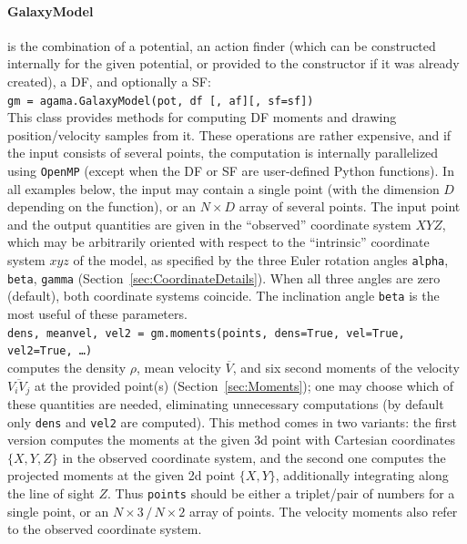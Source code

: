 \documentclass[12pt]{article}
\let\oldparagraph\paragraph
\renewcommand{\paragraph}[1]{\vspace{-2mm}\oldparagraph{#1}}
\begin{document}
\paragraph{GalaxyModel} is the combination of a potential, an action finder (which can be constructed internally for the given potential, or provided to the constructor if it was already created), a DF, and optionally a SF:\\
\texttt{gm = agama.GalaxyModel(pot, df [, af][, sf=sf])}\\[2mm]
This class provides methods for computing DF moments and drawing position/velocity samples from it. These operations are rather expensive, and if the input consists of several points, the computation is internally parallelized using \texttt{OpenMP} (except when the DF or SF are user-defined Python functions). In all examples below, the input may contain a single point (with the dimension $D$ depending on the function), or an $N\times D$ array of several points. The input point and the output quantities are given in the ``observed'' coordinate system $XYZ$, which may be arbitrarily oriented with respect to the ``intrinsic'' coordinate system $xyz$ of the model, as specified by the three Euler rotation angles \texttt{alpha}, \texttt{beta}, \texttt{gamma} (Section~\ref{sec:CoordinateDetails}). When all three angles are zero (default), both coordinate systems coincide. The inclination angle \texttt{beta} is the most useful of these parameters.
\\[2mm]
\texttt{dens, meanvel, vel2 = gm.moments(points, dens=True, vel=True, vel2=True, \dots)}\\
computes the density $\rho$, mean velocity $\overline V$, and six second moments of the velocity $\overline{V_i V_j}$ at the provided point(s) (Section~\ref{sec:Moments}); one may choose which of these quantities are needed, eliminating unnecessary computations (by default only \texttt{dens} and \texttt{vel2} are computed). This method comes in two variants: the first version computes the moments at the given 3d point with Cartesian coordinates $\{X,Y,Z\}$ in the observed coordinate system, and the second one computes the projected moments at the given 2d point $\{X,Y\}$, additionally integrating along the line of sight $Z$. Thus \texttt{points} should be either a triplet/pair of numbers for a single point, or an $N\times3\,/\,N\times2$ array of points. The velocity moments also refer to the observed coordinate system.
\end{document}
